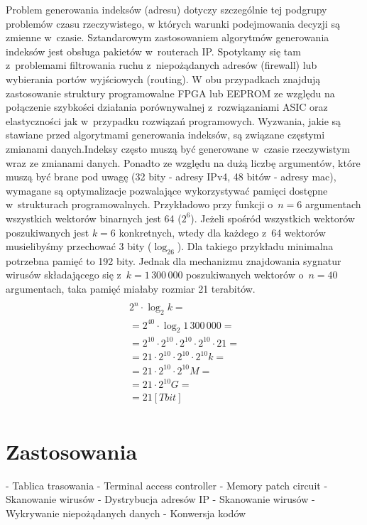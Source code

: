 Problem generowania indeksów (adresu) dotyczy szczególnie tej podgrupy problemów czasu rzeczywistego,
w których warunki podejmowania decyzji są zmienne w~czasie.
Sztandarowym zastosowaniem algorytmów generowania indeksów jest obsługa pakietów w~routerach IP.
Spotykamy się tam z~problemami filtrowania ruchu z~niepożądanych adresów (firewall) lub wybierania portów wyjściowych (routing).
W obu przypadkach znajdują zastosowanie struktury programowalne FPGA lub EEPROM
ze względu na połączenie szybkości działania porównywalnej z~rozwiązaniami ASIC oraz elastyczności jak w~przypadku rozwiązań programowych.
Wyzwania,
jakie są stawiane przed algorytmami generowania indeksów,
są związane częstymi zmianami danych.Indeksy często muszą być generowane w~czasie rzeczywistym wraz ze zmianami danych.
Ponadto ze względu na dużą liczbę argumentów,
które muszą być brane pod uwagę (32 bity - adresy IPv4, 48 bitów - adresy mac),
wymagane są optymalizacje pozwalające wykorzystywać pamięci dostępne w~strukturach programowalnych.
Przykładowo przy funkcji o~$n=6$ argumentach wszystkich wektorów binarnych jest 64 ($2^6$).
Jeżeli spośród wszystkich wektorów poszukiwanych jest $k=6$ konkretnych, wtedy dla każdego z~64 wektorów musielibyśmy przechować 3 bity ($\log_26$).
Dla takiego przykładu minimalna potrzebna pamięć to 192 bity.
Jednak dla mechanizmu znajdowania sygnatur wirusów składającego się z~$k=1\,300\,000$ poszukiwanych wektorów o~$n=40$ argumentach, taka pamięć miałaby rozmiar 21 terabitów.
\begin{multline} \\
2^n \cdot \log_2 k = \\
= 2^{40} \cdot \log_2 1\,300\,000 = \\
= 2^{10} \cdot 2^{10} \cdot 2^{10} \cdot 2^{10} \cdot 21 = \\
=21 \cdot 2^{10} \cdot 2^{10} \cdot 2^{10} k = \\
=21 \cdot 2^{10} \cdot 2^{10} M = \\
=21 \cdot 2^{10} G = \\
=21 [Tbit] \\
\end{multline}


\section{Zastosowania}
- Tablica trasowania
- Terminal access controller
- Memory patch circuit
- Skanowanie wirusów
- Dystrybucja adresów IP
- Skanowanie wirusów
- Wykrywanie niepożądanych danych
- Konwersja kodów

